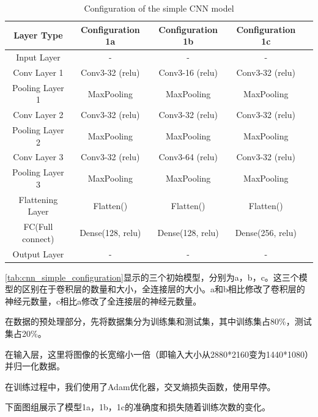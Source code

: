 \begin{table}[H]
\centering
\caption{Configuration of the simple CNN model}
\begin{tabular}{ccccc}
    \toprule
    \textbf{Layer Type} & \textbf{Configuration 1a} & \textbf{Configuration 1b} & \textbf{Configuration 1c} \\
    \midrule
    Input Layer & - & - & - \\
    Conv Layer 1 & Conv3-32 (relu) & Conv3-16 (relu) & Conv3-32 (relu) \\
    Pooling Layer 1 & MaxPooling & MaxPooling& MaxPooling \\
    Conv Layer 2 & Conv3-32 (relu) & Conv3-32 (relu) & Conv3-32 (relu) \\
    Pooling Layer 2 & MaxPooling & MaxPooling& MaxPooling \\
    Conv Layer 3 & Conv3-32 (relu) & Conv3-64 (relu) & Conv3-32 (relu) \\
    Pooling Layer 3 & MaxPooling & MaxPooling& MaxPooling \\
    Flattening Layer & Flatten() & Flatten() & Flatten() \\
    FC(Full connect) & Dense(128, relu) & Dense(128, relu) & Dense(256, relu) \\
    Output Layer & - & - & - \\
    \bottomrule
\end{tabular}
\label{tab:cnn_simple_configuration}
\end{table}

\autoref{tab:cnn_simple_configuration}显示的三个初始模型，分别为a，b，c。这三个模型的区别在于卷积层的数量和大小，全连接层的大小。a和b相比修改了卷积层的神经元数量，c相比a修改了全连接层的神经元数量。

在数据的预处理部分，先将数据集分为训练集和测试集，其中训练集占80\%，测试集占20\%。

在输入层，这里将图像的长宽缩小一倍（即输入大小从2880*2160变为1440*1080）并归一化数据。

在训练过程中，我们使用了Adam优化器，交叉熵损失函数，使用早停。

下面图组展示了模型1a，1b，1c的准确度和损失随着训练次数的变化。

